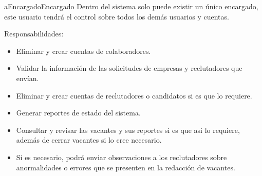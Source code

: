 \begin{actor}{aEncargado}{Encargado}{%
    Dentro del sistema solo puede existir un único encargado, este usuario tendrá el control sobre todos los demás usuarios y cuentas.
   }   
   \item[Responsabilidades:] \hfill
    \begin{itemize}
        \item Eliminar y crear cuentas de colaboradores.
        \item Validar la información de las solicitudes de empresas y reclutadores que envían.
        \item Eliminar y crear cuentas de reclutadores o candidatos si es que lo requiere.
        \item Generar reportes de estado del sistema.
        \item Consultar y revisar las vacantes y sus reportes si es que asi lo requiere, además de cerrar vacantes si lo cree necesario.
        \item Si es necesario, podrá enviar observaciones a los reclutadores sobre anormalidades o errores que se presenten en la redacción de vacantes.
    \end{itemize}

\end{actor}